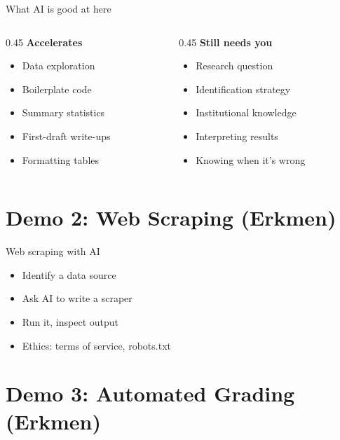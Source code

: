 \documentclass[aspectratio=169]{beamer}
\begin{document}
\begin{frame}{What AI is good at here}
\begin{columns}
\begin{column}{0.45\textwidth}
\textbf{Accelerates}
\begin{itemize}
    \item Data exploration
    \item Boilerplate code
    \item Summary statistics
    \item First-draft write-ups
    \item Formatting tables
\end{itemize}
\end{column}
\begin{column}{0.45\textwidth}
\textbf{Still needs you}
\begin{itemize}
    \item Research question
    \item Identification strategy
    \item Institutional knowledge
    \item Interpreting results
    \item Knowing when it's wrong
\end{itemize}
\end{column}
\end{columns}
\end{frame}

\section{Demo 2: Web Scraping (Erkmen)}

\begin{frame}{Web scraping with AI}
\begin{itemize}
    \item Identify a data source
    \item Ask AI to write a scraper
    \item Run it, inspect output
    \item Ethics: terms of service, robots.txt
\end{itemize}
\end{frame}

\section{Demo 3: Automated Grading (Erkmen)}
\end{document}
